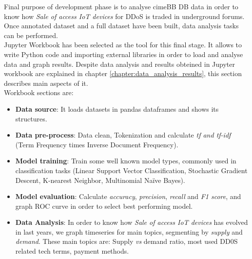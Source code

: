 Final purpose of development phase is to analyse cimeBB DB data in order to know how \textit{Sale of access IoT devices} for DDoS is traded in underground forums.
Once annotated dataset and a full dataset have been built, data analysis tasks can be performed.\\
Jupyter Workbook has been selected as the tool for this final stage. It allows to write Python code and importing external libraries in order to load and analyse data and graph results. Despite data analysis and results obteined in Jupyter workbook are explained in chapter \ref{chapter:data_analysis_results}, this section describes main aspects of it.\\
Workbook sections are:
\begin{itemize}
    \item \textbf{Data source}: It loads datasets in pandas dataframes \cite{dataframe} and shows its structures.
    \item \textbf{Data pre-process}: Data clean, Tokenization and calculate \textit{tf and tf-idf} (Term Frequency times Inverse Document Frequency).
    \item \textbf{Model training}: Train some well known model types, commonly used in classification tasks (Linear Support Vector Classification, Stochastic Gradient Descent, K-nearest Neighbor, Multinomial Naïve Bayes).
    \item \textbf{Model evaluation}: Calculate \textit{accuracy}, \textit{precision}, \textit{recall} and \textit{F1 score}, and graph ROC curve in order to select best performing model.
    \item \textbf{Data Analysis}: In order to know how \textit{Sale of access IoT devices} has evolved in last years, we graph timeseries for main topics, segmenting by \textit{supply} and \textit{demand}. These main topics are: Supply \textit{vs} demand ratio, most used DD0S related tech terms, payment methods.
\end{itemize}
